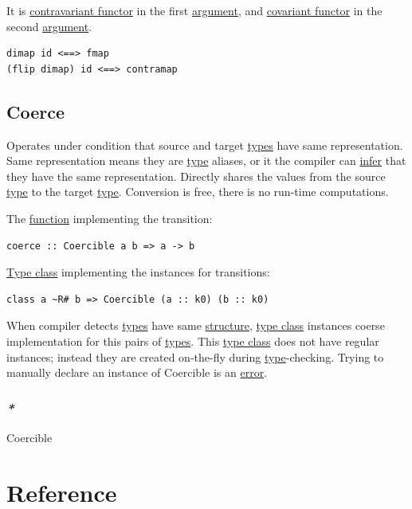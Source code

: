 \documentclass[a4paper,14pt,oneside]{book}
\begin{document}
It is \hyperref[orgd10f944]{contravariant functor} in the first \hyperref[org1fec073]{argument}, and \hyperref[orgbaf15e7]{covariant functor} in the second \hyperref[org1fec073]{argument}.

\begin{verbatim}
dimap id <==> fmap
(flip dimap) id <==> contramap
\end{verbatim}

\chapter{Coerce}
\label{sec:org81484af}

Operates under condition that source and target \hyperref[org787c804]{types} have same representation.
Same representation means they are \hyperref[orgd9ae293]{type} aliases, or it the compiler can \hyperref[orgd2fe43c]{infer} that they have the same representation. 
Directly shares the values from the source \hyperref[orgd9ae293]{type} to the target \hyperref[orgd9ae293]{type}.
Conversion is free, there is no run-time computations.

The \hyperref[org7598ee2]{function} implementing the transition:
\begin{verbatim}
coerce :: Coercible a b => a -> b
\end{verbatim}

\hyperref[orgb0d5d30]{Type class} implementing the instances for transitions:
\begin{verbatim}
class a ~R# b => Coercible (a :: k0) (b :: k0)
\end{verbatim}
When compiler detects \hyperref[org787c804]{types} have same \hyperref[org77aabc9]{structure}, \hyperref[orgb0d5d30]{type class} instances coerse implementation for this pairs of \hyperref[org787c804]{types}. This \hyperref[orgb0d5d30]{type class} does not have regular instances; instead they are created on-the-fly during \hyperref[orgd9ae293]{type}-checking. Trying to manually declare an instance of Coercible is an \hyperref[orgc3d12d2]{error}.

\section{\emph{*}}
\label{sec:orgf2197b9}

Coercible

\part{Reference}
\label{sec:org7b938ab}
\end{document}
